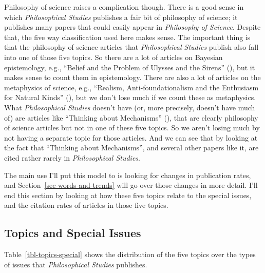 \documentclass[
  10pt,
  letterpaper,
  DIV=11,
  numbers=noendperiod,
  twoside]{scrartcl}
\begin{document}
Philosophy of science raises a complication though. There is a good
sense in which \emph{Philosophical Studies} publishes a fair bit of
philosophy of science; it publishes many papers that could easily appear
in \emph{Philosophy of Science}. Despite that, the five way
classification used here makes sense. The important thing is that the
philosophy of science articles that \emph{Philosophical Studies} publish
also fall into one of those five topics. So there are a lot of articles
on Bayesian epistemology, e.g., ``Belief and the Problem of Ulysses and
the Sirens'' (), but
it makes sense to count them in epistemology. There are also a lot of
articles on the metaphysics of science, e.g., ``Realism,
Anti-foundationalism and the Enthusiasm for Natural Kinds''
(), but we don't lose much
if we count these as metaphysics. What \emph{Philosophical Studies}
doesn't have (or, more precisely, doesn't have much of) are articles
like ``Thinking about Mechanisms''
(),
that are clearly philosophy of science articles but not in one of these
five topics. So we aren't losing much by not having a separate topic for
those articles. And we can see that by looking at the fact that
``Thinking about Mechanisms'', and several other papers like it, are
cited rather rarely in \emph{Philosophical Studies}.

The main use I'll put this model to is looking for changes in
publication rates, and Section~\ref{sec-words-and-trends} will go over
those changes in more detail. I'll end this section by looking at how
these five topics relate to the special issues, and the citation rates
of articles in those five topics.

\subsection{Topics and Special Issues}\label{topics-and-special-issues}

Table~\ref{tbl-topics-special} shows the distribution of the five topics
over the types of issues that \emph{Philosophical Studies} publishes.
\end{document}
